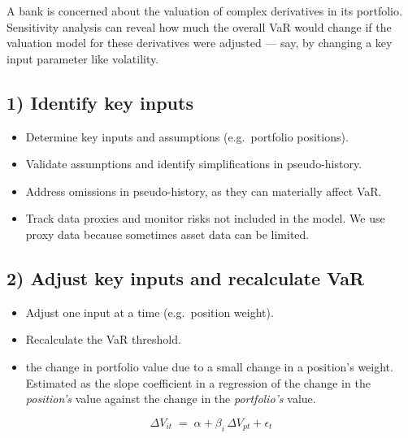 \begin{mrexbox}[title={Example of sensitivity analysis}]
A bank is concerned about the valuation of complex derivatives in its portfolio. Sensitivity
analysis can reveal how much the overall VaR would change if the valuation model for these
derivatives were adjusted --- say, by changing a key input parameter like volatility.
\end{mrexbox}

\subsection{1) Identify key inputs}
\begin{itemize}
\item Determine key inputs and assumptions (e.g.\ portfolio positions).
\item Validate assumptions and identify simplifications in pseudo-history.
\item Address omissions in pseudo-history, as they can materially affect VaR.
\item Track data proxies and monitor risks not included in the model. We use proxy data because
      sometimes asset data can be limited.
\end{itemize}

\subsection{2) Adjust key inputs and recalculate VaR}
\begin{itemize}
\item Adjust one input at a time (e.g.\ position weight).
\item Recalculate the VaR threshold.
\item {} the change in portfolio value due to a small change in a position's
      weight. Estimated as the slope coefficient in a regression of the change in the
      \textit{position's} value against the change in the \textit{portfolio's} value.
\end{itemize}

\begin{mrfmlbox}
\[ \Delta V_{it} \;=\; \alpha + \beta_i\, \Delta V_{pt} + \epsilon_t \]
\end{mrfmlbox}

